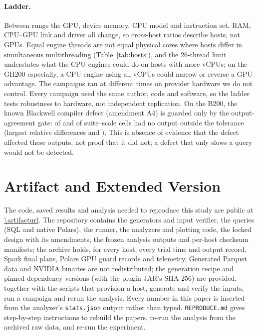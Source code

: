 \documentclass[sigconf, nonacm]{acmart}
\begin{document}
\paragraph{Ladder.} Between rungs the GPU, device memory, CPU model and
instruction set, RAM, CPU--GPU link and driver all change, so cross-host ratios
describe hosts, not GPUs. Equal engine threads are not equal physical cores
where hosts differ in simultaneous multithreading (Table~\ref{tab:hosts}), and
the 26-thread limit understates what the CPU engines could do on hosts with
more vCPUs; on the GH200 especially, a CPU engine using all vCPUs could narrow
or reverse a GPU advantage. The campaigns ran at different times on provider
hardware we do not control. Every campaign used the same author, code and
software, so the ladder tests robustness to hardware, not independent
replication.
\ifbtwohundredran
On the B200, the known Blackwell compiler defect (amendment A4) is guarded only
by the output-agreement gate: 
of  \polarsgpu{} and
 of
 \sparkgpu{} suite--scale cells had
no output outside the tolerance (largest relative differences
 and
). This is absence of evidence
that the defect affected these outputs, not proof that it did not; a defect
that only slows a query would not be detected.
\fi

\section{Artifact and Extended Version}
\label{sec:artifact}

The code, saved results and analysis needed to reproduce this study are
public at \url{\artifacturl}.\artifactdoisentence{} The repository contains the generators and input verifier,
the queries (SQL and native Polars), the runner, the analyzers and plotting
code, the locked design with its amendments, the frozen analysis outputs and
per-host checksum manifests; the archive holds, for every host, every trial
time and output record, Spark final plans, Polars GPU guard records and
telemetry.
Generated Parquet data and NVIDIA binaries are not redistributed; the
generation recipe and pinned dependency versions (with the plugin JAR's
SHA-256) are provided, together with the scripts that provision a host,
generate and verify the inputs, run a campaign and rerun the analysis. Every
number in this paper is inserted from the analyzer's \texttt{stats.json}
output rather than typed. \texttt{REPRODUCE.md} gives step-by-step
instructions to rebuild the papers, re-run the analysis from the archived raw
data, and re-run the experiment.
\end{document}
